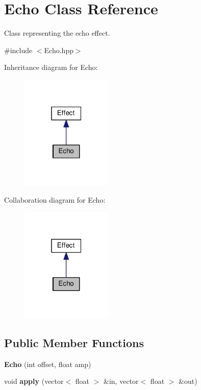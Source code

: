 \hypertarget{class_echo}{}\section{Echo Class Reference}
\label{class_echo}


Class representing the echo effect.  




{\ttfamily \#include $<$Echo.\+hpp$>$}



Inheritance diagram for Echo\+:
\nopagebreak
\begin{figure}[H]
\begin{center}
\leavevmode
\includegraphics[width=123pt]{class_echo__inherit__graph}
\end{center}
\end{figure}


Collaboration diagram for Echo\+:
\nopagebreak
\begin{figure}[H]
\begin{center}
\leavevmode
\includegraphics[width=123pt]{class_echo__coll__graph}
\end{center}
\end{figure}
\subsection*{Public Member Functions}
\begin{DoxyCompactItemize}
\item 
\mbox{\label{class_echo_a1b536118bddd87a9ed0edf820e2a3ba5}} 
{\bfseries Echo} (int offset, float amp)
\item 
\mbox{\label{class_echo_a5b538db2470721e9ac8987e33a4d7f23}} 
void {\bfseries apply} (vector$<$ float $>$ \&in, vector$<$ float $>$ \&out)
\end{DoxyCompactItemize}



